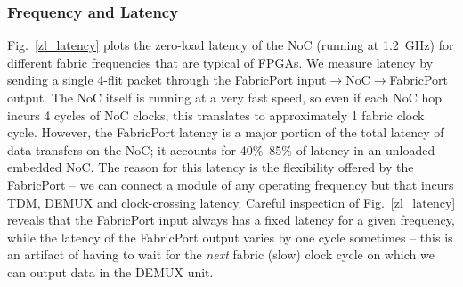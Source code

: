%
%

%
\subsubsection{Frequency and Latency}
%


Fig.~\ref{zl_latency} plots the zero-load latency of the NoC (running at 1.2~GHz) for different fabric frequencies that are typical of FPGAs.
We measure latency by sending a single 4-flit packet through the FabricPort input$\rightarrow$NoC$\rightarrow$FabricPort output.
The NoC itself is running at a very fast speed, so even if each NoC hop incurs 4 cycles of NoC clocks, this translates to approximately 1 fabric clock cycle.
However, the FabricPort latency is a major portion of the total latency of data transfers on the NoC; it accounts for 40\%--85\% of latency in an unloaded embedded NoC.
The reason for this latency is the flexibility offered by the FabricPort -- we can connect a module of any operating frequency but that incurs TDM, DEMUX and clock-crossing latency.
Careful inspection of Fig.~\ref{zl_latency} reveals that the FabricPort input always has a fixed latency for a given frequency, while the latency of the FabricPort output varies by one cycle sometimes -- this is an artifact of having to wait for the \textit{next} fabric (slow) clock cycle on which we can output data in the DEMUX unit.


%
%
